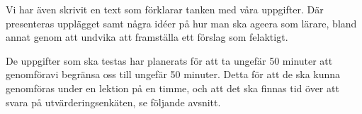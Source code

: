     \textcolor{lila}{Vi har även skrivit en text som förklarar tanken med våra uppgifter. Där presenteras upplägget samt några idéer  på hur man ska ageera som lärare, bland annat genom  att undvika att framställa ett förslag som felaktigt.}
    
    \textcolor{lila}{De uppgifter som ska testas har planerats för att ta ungefär 50 minuter att genomföravi begränsa oss till ungefär 50 minuter. Detta för att de ska kunna genomföras under en lektion på en timme, och att det ska finnas tid över att svara på utvärderingsenkäten, se följande avsnitt.}        

            
            